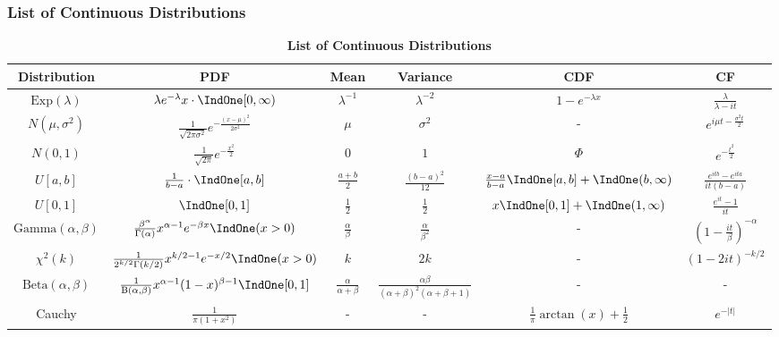 \subsubsection{List of Continuous Distributions}
\bgroup
\def\arraystretch{2.0}
\begin{table}[h]
	\centering
	\begin{tabular}{ c | c | c | c | c | c }
		\hline 
		\textbf{Distribution} & \textbf{PDF} & \textbf{Mean} &\textbf{Variance} & \textbf{CDF} & \textbf{CF} \\
		\hline
		$\mathrm{Exp}(\lambda)$ & $\lambda e^{-\lambda}x \cdot \IndOne[0,\infty)$ & $\lambda^{-1}$ & $\lambda^{-2}$ & $1-e^{- \lambda x}$ & $\frac{\lambda}{\lambda - it}$  \\
		$N(\mu, \sigma^2)$ &  $\frac{1}{\sqrt{ 2\pi \sigma^2 }} e^{ - \frac{ (x-\mu)^2 }{ 2 \sigma^2}} $ & $\mu$ & $\sigma^2$ & - & $e^{i\mu t - \frac{ \sigma^2 t }{ 2}}$ \\
		$N(0, 1)$ & $\frac{1}{\sqrt{ 2\pi  }} e^{ - \frac{ x^2 }{ 2}} $ & $0$ & $1$ & $\Phi$ & $e^{-\frac{t^2}{2}}$ \\ 
		$U[a,b]$ & $\frac{1}{b-a}\cdot \IndOne[a,b] $ & $\frac{a+b}{2}$ & $\frac{(b-a)^2}{12}$ & $\frac{x-a}{b-a}\IndOne[a,b]+\IndOne(b,\infty)$ & $\frac{e^{itb} - e^{ita}}{it(b-a)}$  \\
		$U[0,1]$ & $\IndOne[0,1]$ & $\frac{1}{2}$ & $\frac{1}{2}$ & $x\IndOne[0,1] + \IndOne(1,\infty)$ & $\frac{e^{it} - 1}{it}$ \\
		$\mathrm{Gamma}(\alpha, \beta)$ & $\frac{\beta^\alpha}{\Gamma(\alpha)} x^{\alpha-1} e^{-\beta x} \IndOne(x > 0)$  & $\frac{\alpha}{\beta}$ & $\frac{\alpha}{\beta^2}$ & - & $(1 - \frac{it}{\beta})^{-\alpha}$ \\
		$\chi^2(k) $ &  $\frac{1}{2^{k/2} \Gamma(k/2)} x^{k/2 - 1} e^{-x/2} \IndOne(x>0)$ & $k$ & $2k$ & - & $(1- 2it)^{-k/2}$  \\ 
		$\mathrm{Beta}(\alpha,\beta)$  & $\frac{1}{\mathrm{B}(\alpha,\beta)}x^{\alpha-1}(1-x)^{\beta-1} \IndOne[0,1] $ & $\frac{\alpha}{\alpha+\beta}$ & $\frac{\alpha \beta}{(\alpha+\beta)^2(\alpha+\beta+1)}$ & - & - \\  
		Cauchy & $\frac{1}{\pi (1 + x^2)}$ & - &  - & $\frac{1}{\pi}\arctan(x) + \frac{1}{2}$ & $e^{-|t|}$ \\
		\hline
	\end{tabular}
	\caption{\textbf{List of Continuous Distributions}}
	\label{tab:ContinuousDist}
\end{table}

